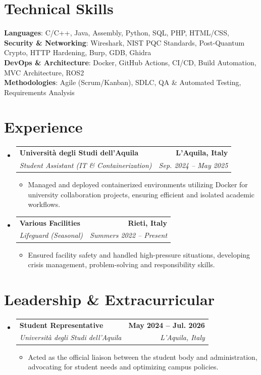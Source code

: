 \documentclass[letterpaper,11pt]{article}
\makeatletter
\newcommand{\resumeItem}[1]{
  \item\small{
    {#1 \vspace{-2pt}}
  }
}
\newcommand{\resumeSubheading}[4]{
  \vspace{-2pt}\item
    \begin{tabular*}{1.0\textwidth}[t]{l@{\extracolsep{\fill}}r}
      \textbf{#1} & \textbf{\small #2} \\
      \textit{\small#3} & \textit{\small #4} \\
    \end{tabular*}\vspace{-7pt}
}
\newcommand{\resumeSubHeadingListStart}{\begin{itemize}[leftmargin=0.0in, label={}]}
\newcommand{\resumeSubHeadingListEnd}{\end{itemize}}
\newcommand{\resumeItemListStart}{\begin{itemize}}
\newcommand{\resumeItemListEnd}{\end{itemize}\vspace{-10pt}}
\makeatother
\begin{document}
\section{Technical Skills}
 \begin{itemize}[leftmargin=0.15in, label={}]
    \small{\item{
     \textbf{Languages}{: C/C++, Java, Assembly, Python, SQL, PHP, HTML/CSS, } \\
     \textbf{Security \& Networking}{: Wireshark, NIST PQC Standards, Post-Quantum Crypto, HTTP Hardening, Burp, GDB, Ghidra} \\
     \textbf{DevOps \& Architecture}{: Docker, GitHub Actions, CI/CD, Build Automation, MVC Architecture, ROS2} \\
     \textbf{Methodologies}{: Agile (Scrum/Kanban), SDLC, QA \& Automated Testing, Requirements Analysis} \\
    }}
 \end{itemize}
\vspace{-15pt}

\section{Experience}
  \resumeSubHeadingListStart
    \resumeSubheading
      {Università degli Studi dell'Aquila}{L'Aquila, Italy}
      {Student Assistant (IT \& Containerization)}{Sep. 2024 -- May 2025}
      \resumeItemListStart
        \resumeItem{Managed and deployed containerized environments utilizing Docker for university collaboration projects, ensuring efficient and isolated academic workflows.}
      \resumeItemListEnd

    \resumeSubheading
      {Various Facilities}{Rieti, Italy}
      {Lifeguard (Seasonal)}{Summers 2022 -- Present}
      \resumeItemListStart
        \resumeItem{Ensured facility safety and handled high-pressure situations, developing crisis management, problem-solving and responsibility skills.}
      \resumeItemListEnd
  \resumeSubHeadingListEnd
\vspace{-10pt}


\section{Leadership \& Extracurricular}
    \resumeSubHeadingListStart
        \resumeSubheading{Student Representative}{May 2024 -- Jul. 2026}{Università degli Studi dell'Aquila}{L'Aquila, Italy}
            \resumeItemListStart
                \resumeItem{Acted as the official liaison between the student body and administration, advocating for student needs and optimizing campus policies.}
            \resumeItemListEnd
    \resumeSubHeadingListEnd
\end{document}
